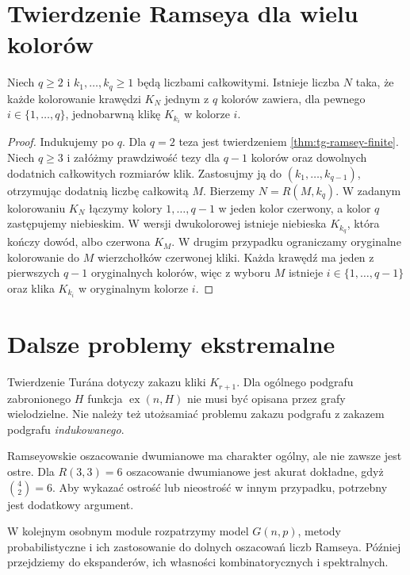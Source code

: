 \section{Twierdzenie Ramseya dla wielu kolorów}
\label{sec:tg-extremal-multicolor}

\begin{twierdzenie}
\label{thm:tg-ramsey-multicolor}
Niech $q\geq2$ i
$k_1,\ldots,k_q\geq1$
będą liczbami całkowitymi.
Istnieje liczba $N$ taka,
że każde kolorowanie
krawędzi $K_N$ jednym
z $q$ kolorów zawiera,
dla pewnego $i\in\{1,\ldots,q\}$,
jednobarwną klikę
$K_{k_i}$ w kolorze $i$.
\end{twierdzenie}
\begin{proof}
Indukujemy po $q$.
Dla $q=2$ teza
jest twierdzeniem
\ref{thm:tg-ramsey-finite}.
Niech $q\geq3$ i załóżmy prawdziwość tezy
dla $q-1$ kolorów oraz dowolnych dodatnich
całkowitych rozmiarów klik.
Zastosujmy ją do $(k_1,\ldots,k_{q-1})$,
otrzymując dodatnią liczbę całkowitą $M$.
Bierzemy $N=R(M,k_q)$.
W zadanym kolorowaniu
$K_N$ łączymy
kolory $1,\ldots,q-1$
w jeden kolor czerwony,
a kolor $q$
zastępujemy niebieskim.
W wersji dwukolorowej
istnieje niebieska
$K_{k_q}$, która
kończy dowód, albo
czerwona $K_M$.
W drugim przypadku ograniczamy oryginalne
kolorowanie do $M$ wierzchołków czerwonej kliki.
Każda krawędź ma jeden z pierwszych $q-1$
oryginalnych kolorów, więc z wyboru $M$
istnieje $i\in\{1,\ldots,q-1\}$ oraz klika
$K_{k_i}$ w oryginalnym kolorze $i$.
\end{proof}

\section{Dalsze problemy ekstremalne}
\label{sec:tg-extremal-next}

Twierdzenie Turána
dotyczy zakazu kliki
$K_{r+1}$.
Dla ogólnego podgrafu
zabronionego $H$
funkcja
$\operatorname{ex}(n,H)$
nie musi być opisana
przez grafy wielodzielne.
Nie należy też utożsamiać
problemu zakazu podgrafu
z zakazem podgrafu
\emph{indukowanego}.

Ramseyowskie oszacowanie
dwumianowe ma charakter
ogólny, ale nie
zawsze jest ostre.
Dla $R(3,3)=6$ oszacowanie dwumianowe jest
akurat dokładne, gdyż $\binom42=6$. Aby wykazać
ostrość lub nieostrość w innym przypadku, potrzebny
jest dodatkowy argument.

W kolejnym osobnym
module rozpatrzymy
model $G(n,p)$,
metody probabilistyczne
i ich zastosowanie
do dolnych oszacowań
liczb Ramseya.
Później przejdziemy
do ekspanderów,
ich własności
kombinatorycznych
i spektralnych.
